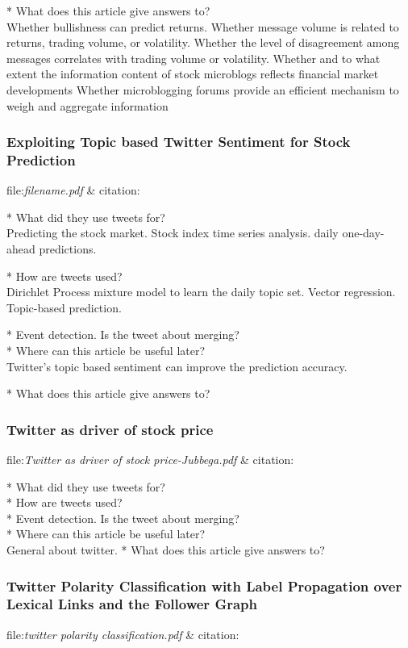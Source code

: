 * What does this article give answers to?\\
Whether bullishness can predict returns.
Whether message volume is related to returns, trading volume, or volatility.
Whether the level of disagreement among messages correlates with trading volume
or volatility.
Whether and to what extent the information content of stock microblogs reflects financial market developments
Whether microblogging forums provide an efficient mechanism to weigh and aggregate information


\subsubsection{Exploiting Topic based Twitter Sentiment for Stock Prediction}
file:\textit{filename.pdf} & citation:\cite[]{mukherjee13}  

* What did they use tweets for?\\
Predicting the stock market. 
Stock index time series analysis. 
daily one-day-ahead predictions. 

* How are tweets used?\\
Dirichlet Process mixture model to learn the daily topic set.
Vector regression. 
Topic-based prediction. 

* Event detection. Is the tweet about merging? \\
* Where can this article be useful later? \\
Twitter’s topic based sentiment can improve the prediction accuracy.
\cite[p28]{mukherjee13}

* What does this article give answers to?\\

\subsubsection{Twitter as driver of stock price}
file:\textit{Twitter as driver of stock price-Jubbega.pdf} &
citation:\cite[]{annikajubbega11:twitter_driver_stock_price}

* What did they use tweets for?\\
* How are tweets used?\\
* Event detection. Is the tweet about merging? \\
* Where can this article be useful later? \\
General about twitter. 
* What does this article give answers to?\\

\subsubsection{Twitter Polarity Classification with Label Propagation over Lexical Links and the Follower Graph}
file:\textit{twitter polarity classification.pdf} & citation:\cite[]{sperious11}

